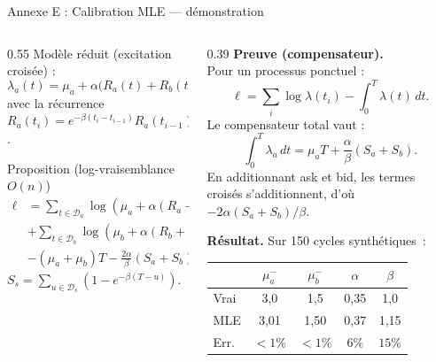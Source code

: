 \documentclass[10pt,aspectratio=169]{beamer}
\begin{document}
\begin{frame}{Annexe E : Calibration MLE --- démonstration}
\begin{columns}[T,onlytextwidth]
\begin{column}{0.55\textwidth}
\footnotesize
Modèle réduit (excitation croisée) :
\[
\lambda_a(t)=\mu_a+\alpha\bigl(R_a(t)+R_b(t)\bigr),
\]
avec la récurrence $R_a(t_i)=e^{-\beta(t_i-t_{i-1})}R_a(t_{i-1})+\mathbf{1}_{t_i\in\mathcal{D}_a}$.

\begin{block}{Proposition (log-vraisemblance $O(n)$)}
\scriptsize
\begin{align*}
\ell &= \sum_{t\in\mathcal{D}_a}\!\log(\mu_a+\alpha(R_a+R_b))\\
     &+\sum_{t\in\mathcal{D}_b}\!\log(\mu_b+\alpha(R_b+R_a))\\
     &-(\mu_a+\mu_b)T
      -\frac{2\alpha}{\beta}(S_a+S_b),
\end{align*}
$S_s=\sum_{u\in\mathcal{D}_s}(1-e^{-\beta(T-u)})$.
\end{block}
\end{column}
\begin{column}{0.39\textwidth}
\scriptsize
\vspace{3ex}
\textbf{Preuve (compensateur).}\\[-0.2ex]
Pour un processus ponctuel :
\[
\ell=\sum_i\log\lambda(t_i)-\int_0^T\lambda(t)\,dt.
\]
Le compensateur total vaut :
\[
\int_0^T\!\lambda_a\,dt=\mu_a T+\frac{\alpha}{\beta}(S_a+S_b).
\]
En additionnant ask et bid, les termes croisés s'additionnent, d'où $-2\alpha(S_a+S_b)/\beta$.

\vspace{0.5ex}
\textbf{Résultat.} Sur 150 cycles synthétiques~:
\begin{center}\scriptsize
\begin{tabular}{lcccc}
\toprule
 & $\mu_a^-$ & $\mu_b^-$ & $\alpha$ & $\beta$\\
\midrule
Vrai & 3{,}0 & 1{,}5 & 0{,}35 & 1{,}0\\
MLE  & 3{,}01 & 1{,}50 & 0{,}37 & 1{,}15\\
Err. & $<1\%$ & $<1\%$ & $6\%$ & $15\%$\\
\bottomrule
\end{tabular}
\end{center}
\end{column}
\end{columns}
\end{frame}
\end{document}
